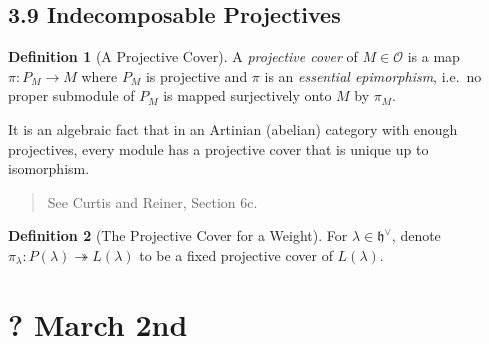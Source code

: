 \documentclass[11pt]{scrartcl}
\theoremstyle{definition}
\theoremstyle{theorem}
\theoremstyle{proof}
\newenvironment{proof}
{\pushQED{$\qed$}\pf}
{\par\popQED\endpf}
\theoremstyle{definition}
\newtheorem{definition}{Definition}[theorem]
\theoremstyle{break}
\theoremstyle{problem}
\newcommand{\dual}[0]{^\vee}
\newcommand{\lieh}[0]{{\mathfrak{h}}}
\newcommand{\OO}[0]{{\mathcal{O}}}
\newcommand{\surjects}[0]{\twoheadrightarrow}
\renewcommand{\qed}[0]{\hfill\blacksquare}
\renewcommand{\to}[0]{\longrightarrow}
\begin{document}
\begin{proof}
\begin{center}
\end{center}

\end{proof}

\hypertarget{indecomposable-projectives}{%
\subsection{3.9 Indecomposable
Projectives}\label{indecomposable-projectives}}

\begin{definition}[A Projective Cover]

A \emph{projective cover} of \(M\in \OO\) is a map \(\pi: P_M \to M\)
where \(P_M\) is projective and \(\pi\) is an \emph{essential
epimorphism}, i.e.~no proper submodule of \(P_M\) is mapped surjectively
onto \(M\) by \(\pi_M\).\end{definition}

It is an algebraic fact that in an Artinian (abelian) category with
enough projectives, every module has a projective cover that is unique
up to isomorphism.

\begin{quote}
See Curtis and Reiner, Section 6c.
\end{quote}

\begin{definition}[The Projective Cover for a Weight]

For \(\lambda \in \lieh\dual\), denote
\(\pi_\lambda: P(\lambda) \surjects L(\lambda)\) to be a fixed
projective cover of \(L(\lambda)\).\end{definition}

\hypertarget{march-2nd}{%
\section{? March 2nd}\label{march-2nd}}
\end{document}
